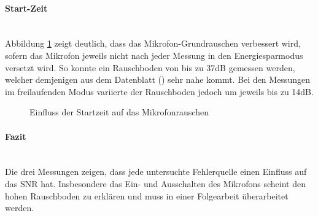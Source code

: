 \documentclass[12pt]{article}
\begin{document}
	\paragraph{Start-Zeit}\mbox{}\\
	Abbildung \ref{fig:startzeit-mikrofon} zeigt deutlich, dass das Mikrofon-Grundrauschen verbessert wird, sofern das Mikrofon jeweils nicht nach jeder Messung in den Energiesparmodus versetzt wird. So konnte ein Rauschboden von bis zu 37dB gemessen werden, welcher demjenigen aus dem Datenblatt (\cite{noauthor_httpsinvensensetdkcomwp-contentuploads202007ds-000157-ics-41351-v14pdf_nodate}) sehr nahe kommt. Bei den Messungen im freilaufenden Modus variierte der Rauschboden jedoch um jeweils bis zu 14dB.
	\begin{figure}[H]
		\centering
		\caption[]{Einfluss der Startzeit auf das Mikrofonrauschen}
		\label{fig:startzeit-mikrofon}
	\end{figure}
	\paragraph{Fazit}\mbox{}\\
	Die drei Messungen zeigen, dass jede untersuchte Fehlerquelle einen Einfluss auf das SNR hat. Insbesondere das Ein- und Ausschalten des Mikrofons scheint den hohen Rauschboden zu erklären und muss in einer Folgearbeit überarbeitet werden.
	
	\newpage
\end{document}
